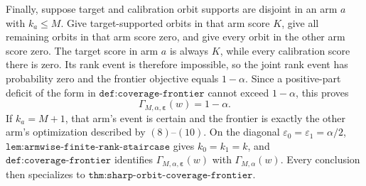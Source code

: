 Finally, suppose target and calibration orbit supports are disjoint in an arm \(a\) with \(k_a\le M\). Give target-supported orbits in that arm score \(K\), give all remaining orbits in that arm score zero, and give every orbit in the other arm score zero. The target score in arm \(a\) is always \(K\), while every calibration score there is zero. Its rank event is therefore impossible, so the joint rank event has probability zero and the frontier objective equals \(1-\alpha\). Since a positive-part deficit of the form in \(\texttt{def:coverage-frontier}\) cannot exceed \(1-\alpha\), this proves
\[
\Gamma_{M,\alpha,\boldsymbol\varepsilon}(w)=1-\alpha.
\]
If \(k_a=M+1\), that arm's event is certain and the frontier is exactly the other arm's optimization described by \((8)\)--\((10)\). On the diagonal \(\varepsilon_0=\varepsilon_1=\alpha/2\), \(\texttt{lem:armwise-finite-rank-staircase}\) gives \(k_0=k_1=k\), and \(\texttt{def:coverage-frontier}\) identifies \(\Gamma_{M,\alpha,\boldsymbol\varepsilon}(w)\) with \(\Gamma_{M,\alpha}(w)\). Every conclusion then specializes to \(\texttt{thm:sharp-orbit-coverage-frontier}\).